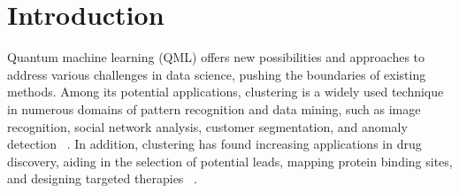 \documentclass[showpacs,twocolumn,superscriptaddress]{revtex4-2}
\begin{document}
\section{Introduction}
Quantum machine learning (QML) offers new possibilities and approaches to address various challenges in data science, pushing the boundaries of existing methods. Among its potential applications, clustering is a widely used technique in numerous domains of pattern recognition and data mining, such as image recognition, social network analysis, customer segmentation, and anomaly detection ~\cite{coleman1979image,baraldi1999survey,jain1999data,madeira2004biclustering,wu2005research,handcock2007model,agrawal2015survey,saxena2017review}. In addition, clustering has found increasing applications in drug discovery, aiding in the selection of potential leads, mapping protein binding sites, and designing targeted therapies ~\cite{voicu2020rcdk,dara2022machine,mak2023artificial}.
\end{document}
